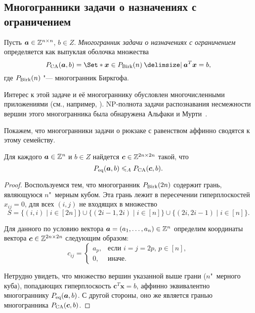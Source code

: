 \subsection{Многогранники задачи о назначениях с ограничением}

Пусть $\bm{a} \in \mathbb{Z}^{n\times n}$, $b \in Z$.
\emph{Многогранник задачи о назначениях с ограничением} определяется как выпуклая оболочка множества
\begin{equation*}
\label{def:CAP}
\CAP(\bm{a},b) = \Set*{\bm{x} \in \Birk(n) \given \bm{a}^T \bm{x} = b},
\end{equation*}
где $P_{\textup{Birk}}(n)$ "--- многогранник Биркгофа.

Интерес к этой задаче и её многограннику обусловлен многочисленными приложениями
(см., например, \cite{Toktas:2006}).
NP-полнота задачи распознавания несмежности вершин этого многогранника была обнаружена Альфаки и Мурти~\cite{Alfakih:1998}.

Покажем, что многогранники задачи о рюкзаке с равенством аффинно сводятся к этому семейству.

\begin{theorem}
\label{thm:KnapEqCAP}
Для каждого $\bm{a} \in \mathbb{Z}^n$ и $b \in Z$ найдется $\bm{c} \in \mathbb{Z}^{2n\times 2n}$ такой, что
\[
P_{\textup{eq}}(\bm{a},b) \leqslant_A P_{\textup{CA}}(\bm{c},b).
\]
\end{theorem}

\begin{proof}
Воспользуемся тем, что многогранник $P_{\textup{Birk}}(2n)$ содержит грань, являющуюся $n$"~мерным кубом. %
Эта грань лежит в пересечении гиперплоскостей $x_{ij} = 0$, для всех $(i,j)$ не входящих в множество 
\[
S = \big\{(i,i) \mid i\in[2n]\big\} \cup \big\{(2i-1,2i) \mid i\in[n]\big\} \cup \big\{(2i,2i-1) \mid i\in[n]\big\}.
\]

Для данного по условию вектора $\bm{a} = (a_1,\dots,a_n) \in \mathbb{Z}^n$ определим координаты вектора $\bm{c} \in \mathbb{Z}^{2n\times 2n}$ следующим образом:
\[
c_{ij} = \begin{cases}
a_p,& \text{если $i=j=2p$, $p\in[n]$},\\
0,& \text{иначе.}
\end{cases}
\]

Нетрудно увидеть, что множество вершин указанной выше грани ($n$"~мерного куба), попадающих гиперплоскость $\bm{c}^T \bm{x} = b$, аффинно эквивалентно многограннику $P_{\textup{eq}}(\bm{a},b)$.
С другой стороны, оно же является гранью многогранника $P_{\textup{CA}}(\bm{c},b)$.
\end{proof}


